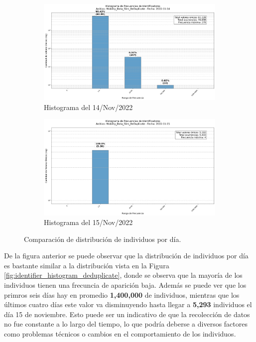 \begin{figure}[H]
    \begin{subfigure}[t]{0.48\textwidth-1em}
        \includegraphics[width=\linewidth]{img/daily_histograms/histograma_identifier_Mobility_Data_Slim_DeDuplicate_2022-11-14.png}
        \caption{Histograma del 14/Nov/2022}
        \label{fig:sub9}
    \end{subfigure}
    \hfill
    \begin{subfigure}[t]{0.48\textwidth-1em}
        \includegraphics[width=\linewidth]{img/daily_histograms/histograma_identifier_Mobility_Data_Slim_DeDuplicate_2022-11-15.png}
        \caption{Histograma del 15/Nov/2022}
        \label{fig:sub10}
    \end{subfigure}
    \caption{Comparación de distribución de individuos por día.}
    \label{fig:histogramas_daily}
\end{figure}

De la figura anterior se puede observar que la distribución de individuos por día es bastante similar a la distribución vista en la Figura \ref{fig:identifier_histogram_deduplicate}, donde se observa que la mayoría de los individuos tienen una frecuncia de aparición baja. Además se puede ver que los primros seis días hay en promedio \textbf{1,400,000} de individuos, mientras que los últimos cuatro días este valor va disminuyendo hasta llegar a \textbf{5,293} individuos el día 15 de noviembre. Esto puede ser un indicativo de que la recolección de datos no fue constante a lo largo del tiempo, lo que podría deberse a diversos factores como problemas técnicos o cambios en el comportamiento de los individuos.